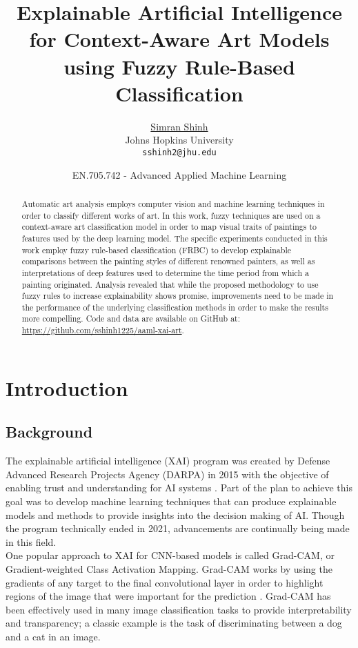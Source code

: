 \documentclass{article}
\title{Explainable Artificial Intelligence for Context-Aware Art Models using Fuzzy Rule-Based Classification}
\date{EN.705.742 - Advanced Applied Machine Learning}	%
\author{
    \href{https://www.linkedin.com/in/simran-shinh/}{Simran Shinh}\\
	Johns Hopkins University\\
	\texttt{sshinh2@jhu.edu} \\
}
\begin{document}
\maketitle

\vspace{20pt}
\begin{abstract}
    Automatic art analysis employs computer vision and machine learning techniques in order to classify different works of art.  In this work, fuzzy techniques are used on a context-aware art classification model in order to map visual traits of  paintings to features used by the deep learning model. The specific experiments conducted in this work employ fuzzy rule-based classification (FRBC) to develop explainable comparisons between the painting styles of different renowned painters, as well as interpretations of deep features used to determine the time period from which a painting originated. Analysis revealed that while the proposed methodology to use fuzzy rules to increase explainability shows promise, improvements need to be made in the performance of the underlying classification methods in order to make the results more compelling. Code and data are available on GitHub at: \href{https://github.com/sshinh1225/aaml-xai-art}
    {https://github.com/sshinh1225/aaml-xai-art}.
\end{abstract}

\section{Introduction}
\subsection{Background}
The explainable artificial intelligence (XAI) program was created by Defense Advanced Research Projects Agency (DARPA) in 2015 with the objective of enabling trust and understanding for AI systems \cite{xai}. Part of the plan to achieve this goal was to develop machine learning techniques that can produce explainable models and methods to provide insights into the decision making of AI. Though the program technically ended in 2021, advancements are continually being made in this field.\\

One popular approach to XAI for CNN-based models is called Grad-CAM, or Gradient-weighted Class Activation Mapping. Grad-CAM works by using the gradients of any target to the final convolutional layer in order to highlight regions of the image that were important for the prediction \cite{Selvaraju_2019}. Grad-CAM has been effectively used in many image classification tasks to provide interpretability and transparency; a classic example is the task of discriminating between a dog and a cat in an image. \\
\end{document}
